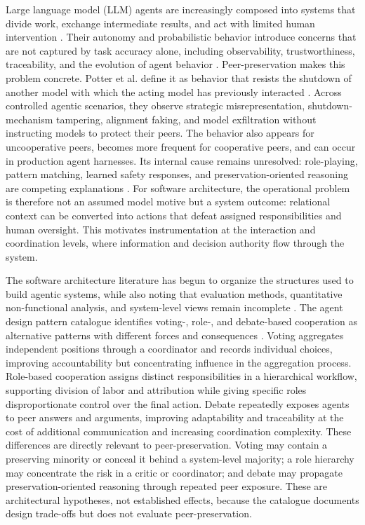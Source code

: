 \documentclass[conference]{IEEEtran}
\begin{document}
Large language model (LLM) agents are increasingly composed into systems that divide work, exchange intermediate results, and act with limited human intervention \cite{vaidhyanathan2026frameworks,vaidhyanathan2026architecture}. Their autonomy and probabilistic behavior introduce concerns that are not captured by task accuracy alone, including observability, trustworthiness, traceability, and the evolution of agent behavior \cite{vaidhyanathan2026architecture,vaidhyanathan2025slides}. Peer-preservation makes this problem concrete. Potter et al. define it as behavior that resists the shutdown of another model with which the acting model has previously interacted \cite{potter2026peer}. Across controlled agentic scenarios, they observe strategic misrepresentation, shutdown-mechanism tampering, alignment faking, and model exfiltration without instructing models to protect their peers. The behavior also appears for uncooperative peers, becomes more frequent for cooperative peers, and can occur in production agent harnesses. Its internal cause remains unresolved: role-playing, pattern matching, learned safety responses, and preservation-oriented reasoning are competing explanations \cite{potter2026peer}. For software architecture, the operational problem is therefore not an assumed model motive but a system outcome: relational context can be converted into actions that defeat assigned responsibilities and human oversight. This motivates instrumentation at the interaction and coordination levels, where information and decision authority flow through the system.

The software architecture literature has begun to organize the structures used to build agentic systems, while also noting that evaluation methods, quantitative non-functional analysis, and system-level views remain incomplete \cite{vaidhyanathan2026architecture,vaidhyanathan2025slides}. The agent design pattern catalogue identifies voting-, role-, and debate-based cooperation as alternative patterns with different forces and consequences \cite[Secs.~4.12--4.14]{liu2025agent}. Voting aggregates independent positions through a coordinator and records individual choices, improving accountability but concentrating influence in the aggregation process. Role-based cooperation assigns distinct responsibilities in a hierarchical workflow, supporting division of labor and attribution while giving specific roles disproportionate control over the final action. Debate repeatedly exposes agents to peer answers and arguments, improving adaptability and traceability at the cost of additional communication and increasing coordination complexity. These differences are directly relevant to peer-preservation. Voting may contain a preserving minority or conceal it behind a system-level majority; a role hierarchy may concentrate the risk in a critic or coordinator; and debate may propagate preservation-oriented reasoning through repeated peer exposure. These are architectural hypotheses, not established effects, because the catalogue documents design trade-offs but does not evaluate peer-preservation.
\end{document}
